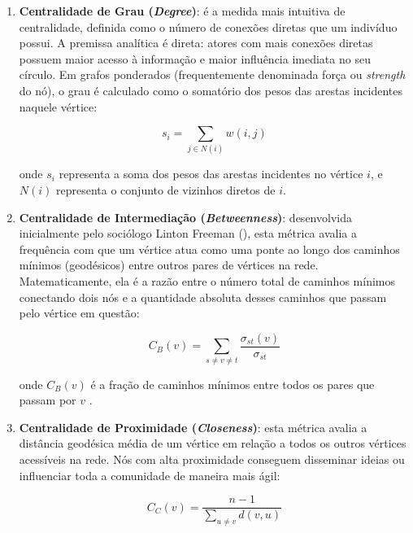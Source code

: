 \documentclass[
      12pt,
      a4paper,
      openright,
      oneside,
      chapter=TITLE,
      section=TITLE,
      english,
      french,
      spanish,
      brazilian
    ]{abntex2}
\begin{document}
    \begin{enumerate}[label=\alph*)]
        \item \textbf{Centralidade de Grau (\textit{Degree})}: é a medida mais intuitiva de centralidade, definida como o número de conexões diretas que um indivíduo possui. A premissa analítica é direta: atores com mais conexões diretas possuem maior acesso à informação e maior influência imediata no seu círculo. Em grafos ponderados (frequentemente denominada força ou \textit{strength} do nó), o grau é calculado como o somatório dos pesos das arestas incidentes naquele vértice:
    
        \begin{equation}
        s_i = \sum_{j \in N(i)} w(i,j)
        \label{eq:grau_ponderado}
        \end{equation}
    
        onde $s_i$ representa a soma dos pesos das arestas incidentes no vértice $i$, e $N(i)$ representa o conjunto de vizinhos diretos de $i$.
    
        \item \textbf{Centralidade de Intermediação (\textit{Betweenness})}: desenvolvida inicialmente pelo sociólogo Linton Freeman (\citeyear{freeman1977}), esta métrica avalia a frequência com que um vértice atua como uma ponte ao longo dos caminhos mínimos (geodésicos) entre outros pares de vértices na rede. Matematicamente, ela é a razão entre o número total de caminhos mínimos conectando dois nós e a quantidade absoluta desses caminhos que passam pelo vértice em questão:
    
        \begin{equation}
        C_B(v) = \sum_{s \neq v \neq t} \frac{\sigma_{st}(v)}{\sigma_{st}}
        \label{eq:betweenness}
        \end{equation}
    
        onde $C_B(v)$ é a fração de caminhos mínimos entre todos os pares que passam por $v$ \cite{freeman1977}.
        
        \item \textbf{Centralidade de Proximidade (\textit{Closeness})}: esta métrica avalia a distância geodésica média de um vértice em relação a todos os outros vértices acessíveis na rede. Nós com alta proximidade conseguem disseminar ideias ou influenciar toda a comunidade de maneira mais ágil:
    
        \begin{equation}
        C_C(v) = \frac{n-1}{\sum_{u \neq v} d(v,u)}
        \label{eq:closeness}
        \end{equation}
    

\end{enumerate}
\end{document}
